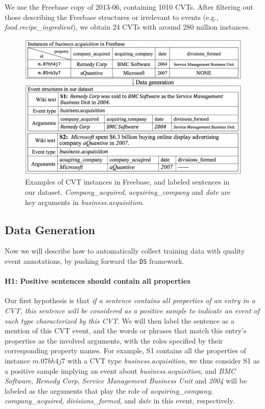 We use the Freebase copy of 2013-06,  %
containing 1010 CVTs. After filtering out those %
describing the Freebase structures  or irrelevant to events (e.g., \emph{food.recipe\_ingredient}), we obtain 24 CVTs with around 280 million instances.
%
\begin{figure}[h]
	\centering
	\includegraphics[width=.45\textwidth]{temp}
	\caption{Examples of CVT instances in Freebase, and labeled sentences in our dataset. \emph{Company\_acquired}, \emph{acquiring\_company} and \emph{date} are key arguments in \emph{business.acquisition}. \label{fig:3}}
\end{figure}

\subsection{Data Generation\label{datagen}}
Now we will describe how to automatically collect training data with quality event annotations, by pushing forward the \texttt{DS} framework.

\paragraph{H1: Positive sentences should contain all properties}
Our first hypothesis is that \textit{if a sentence contains all properties of an entry in a CVT, this sentence will be
considered as a positive sample to indicate an event of such type characterized by this CVT}.
We will then label the sentence as a mention of this CVT event, and the words or phrases that
match this entry's properties as the involved arguments, with the roles specified by their
corresponding property names.
For example, S1 contains all the properties of instance $m.07bh4j7$ with a CVT type \emph{business.acquisition},
we thus consider S1 as a positive sample implying an event about \emph{business.acquisition}, and \emph{BMC Software}, \emph{Remedy Corp}, \emph{Service Management Business Unit} and \emph{2004} will be labeled as the arguments that play the role of \emph{acquiring\_company}, \emph{company\_acquired}, \emph{divisions\_formed}, and \emph{date} in this event, respectively.

